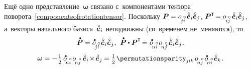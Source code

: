 \begin{otherlanguage}{russian}
Ещё одно представление~$\bm{\omega}$ связано с~компонентами тензора поворота~\eqref{componentsofrotationtensor}. Поскольку ${\bm{P} = \cosinematrix{\!j\mathcircabove{i}} \hspace{.4ex} \mathcircabove{\bm{e}}_i \mathcircabove{\bm{e}}_j}$, ${\bm{P}^{\T} \hspace{-0.32ex} = \cosinematrix{\hspace{-0.2ex}i\mathcircabove{j}} \hspace{.4ex} \mathcircabove{\bm{e}}_i \mathcircabove{\bm{e}}_j}$, а~векторы начального базиса~${\mathcircabove{\bm{e}}_i}$ неподвижны (со~временем не~меняются), то
\nopagebreak\vspace{.25em}\[ \mathdotabove{\bm{P}} = \cosinematrixdotted{\!j\mathcircabove{i}} \hspace{.4ex} \mathcircabove{\bm{e}}_i \mathcircabove{\bm{e}}_j
\hspace{.1ex} , \:\,
\mathdotabove{\bm{P}} \dotp \bm{P}^{\T} \hspace{-0.32ex} = \hspace{.1ex} \cosinematrixdotted{\hspace{-0.4ex}n\mathcircabove{i}} \hspace{.4ex} \cosinematrix{\hspace{-0.4ex}n\mathcircabove{j}} \hspace{.4ex} \mathcircabove{\bm{e}}_i \mathcircabove{\bm{e}}_j
\hspace{.1ex}, \]
\nopagebreak\vspace{-0.64em}\begin{equation}
\bm{\omega} = - \hspace{.1ex} \smalldisplaystyleonehalf \hspace{.4ex} \cosinematrixdotted{\hspace{-0.4ex}n\mathcircabove{i}} \hspace{.4ex} \cosinematrix{\hspace{-0.4ex}n\mathcircabove{j}} \hspace{.5ex} \mathcircabove{\bm{e}}_i \hspace{-0.3ex}\times\hspace{-0.3ex} \mathcircabove{\bm{e}}_j \hspace{-0.1ex} =
\smalldisplaystyleonehalf \hspace{.2ex} \permutationsparity_{j\hspace{-0.06ex}ik} \hspace{.32ex} \cosinematrix{\hspace{-0.4ex}n\mathcircabove{j}} \hspace{.4ex} \cosinematrixdotted{\hspace{-0.4ex}n\mathcircabove{i}} \hspace{.4ex} \mathcircabove{\bm{e}}_k
\hspace{.2ex} .
\end{equation}


\end{otherlanguage}

